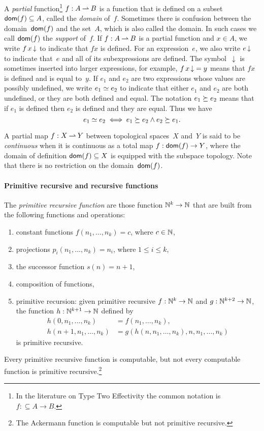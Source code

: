 A \emph{partial} function\footnote{In the literature on Type Two
  Effectivity the common notation is $f \mathbin{{:}{\subseteq}} A \to
  B$.} $f: A \mathbin{\rightharpoonup} B$ is a function that is defined on a subset
$\mathsf{dom}(f) \subseteq A$, called the \emph{domain} of~$f$. Sometimes
there is confusion between the domain~$\mathsf{dom}(f)$ and the set~$A$, which
is also called the domain. In such cases we call $\mathsf{dom}(f)$ the
\emph{support} of~$f$. If $f: A \mathbin{\rightharpoonup} B$ is a partial function and $x
\in A$, we write $f\, x\,{\downarrow}$ to indicate that $f x$ is defined.
For an expression~$e$, we also write $e\,{\downarrow}$ to indicate
that~$e$ and all of its subexpressions are defined. The
symbol~$\downarrow$ is sometimes inserted into larger expressions, for
example, $f\, x\,{\downarrow} = y$ means that $f x$ is defined and is
equal to~$y$. If $e_1$ and $e_2$ are two expressions whose values are
possibly undefined, we write $e_1 \simeq e_2$ to indicate that either
$e_1$ and $e_2$ are both undefined, or they are both defined and
equal. The notation $e_1 \succeq e_2$ means that if $e_1$ is defined
then $e_2$ is defined and they are equal. Thus we have
%
\begin{equation*}
  e_1 \simeq e_2 \iff e_1 \succeq e_2 \land e_2 \succeq e_1.
\end{equation*}

A partial map $f: X \mathbin{\rightharpoonup} Y$ between topological spaces~$X$ and~$Y$
is said to be \emph{continuous} when it is continuous as a total map
$f: \mathsf{dom}(f) \to Y$, where the domain of definition $\mathsf{dom}(f) \subseteq
X$ is equipped with the subspace topology. Note that there is no
restriction on the domain~$\mathsf{dom}(f)$.



\paragraph{Primitive recursive and recursive functions}

The \emph{primitive recursive function} are those function $\mathbb{N}^k \to
\mathbb{N}$ that are built from the following functions and operations:
%
\begin{enumerate}
\item constant functions $f(n_1, \ldots, n_k) = c$, where $c \in \mathbb{N}$,
\item projections $p_i(n_1, \ldots, n_k) = n_i$, where $1 \leq i \leq k$,
\item the successor function $s(n) = n + 1$,
\item composition of functions,
\item primitive recursion: given primitive recursive $f : \mathbb{N}^k \to
  \mathbb{N}$ and $g : \mathbb{N}^{k+2} \to \mathbb{N}$, the function $h : \mathbb{N}^{k+1} \to
  \mathbb{N}$ defined by
  \begin{align*}
    h(0, n_1, \ldots, n_k) &= f(n_1, \ldots, n_k), \\
    h(n+1, n_1, \ldots, n_k) &= g(h(n, n_1, \ldots, n_k), n, n_1,
    \ldots, n_k)    
  \end{align*}
  is primitive recursive.
\end{enumerate}
%
Every primitive recursive function is computable, but not every
computable function is primitive recursive.\footnote{The Ackermann
  function is computable but not primitive recursive.}


